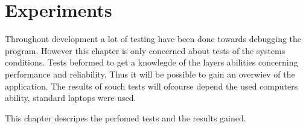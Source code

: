 \chapter{Experiments}\label{chap:experiments}
Throughout development a lot of testing have been done towards debugging the program. However this chapter is only concerned about tests of the systems conditions. Tests beformed to get a knowlegde of the layers abilities concerning performance and reliability. Thus it will be possible to gain an overwiev of the application. The results of souch tests will ofcourse depend the used computers ability, standard laptops were used. 


This chapter descripes the perfomed tests and the results gained.





